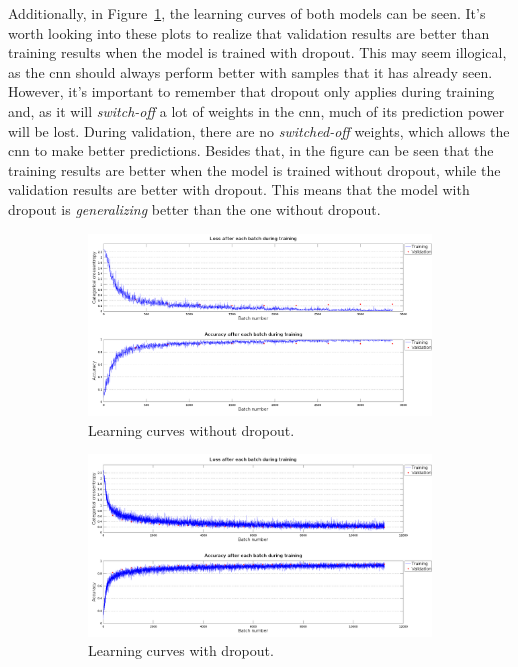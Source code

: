 Additionally, in Figure~\ref{fig:lc_dropout}, the learning curves of both models can be seen. It's worth looking into these plots to realize that validation results are better than training results when the model is trained with dropout. This may seem illogical, as the \gls{cnn} should always perform better with samples that it has already seen. However, it's important to remember that dropout only applies during training and, as it will \textit{switch-off} a lot of weights in the \gls{cnn}, much of its prediction power will be lost. During validation, there are no \textit{switched-off} weights, which allows the \gls{cnn} to make better predictions. Besides that, in the figure can be seen that the training results are better when the model is trained without dropout, while the validation results are better with dropout. This means that the model with dropout is \emph{generalizing} better than the one without dropout. 
\begin{figure}
	\begin{subfigure}{1\textwidth}
		\centering
		\includegraphics[width=1\linewidth]{figures/lc_nodropout.png}
		\caption{Learning curves without dropout.}
	\end{subfigure}
	\begin{subfigure}{1\textwidth}
		\centering
		\includegraphics[width=1\linewidth]{figures/lc_dropout.png}
		\caption{Learning curves with dropout.}
	\end{subfigure}
	\caption[Learning curves with and without dropout.]{}
	\label{fig:lc_dropout}
\end{figure}

